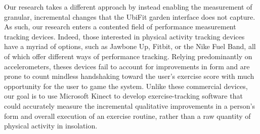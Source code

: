 Our research takes a different approach by instead enabling the measurement of granular, incremental changes that the UbiFit garden interface does not capture. As such, our research enters a contented field of performance measurement tracking devices. Indeed, those interested in physical activity tracking devices have a myriad of options, such as Jawbone Up, Fitbit, or the Nike Fuel Band, all of which offer different ways of performance tracking. Relying predominantly on accelerometers, theses devices fail to account for improvements in form and are prone to count mindless handshaking toward the user's exercise score with much opportunity for the user to game the system. Unlike these commercial devices, our goal is to use Microsoft Kinect to develop exercise-tracking software that could accurately measure the incremental qualitative improvements in a person's form and overall execution of an exercise routine, rather than a raw quantity of physical activity in insolation.

